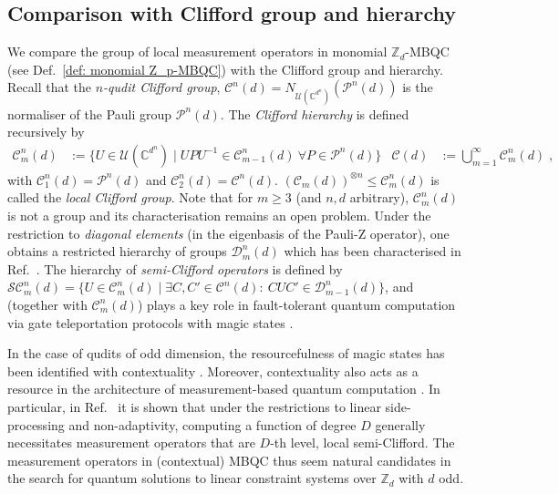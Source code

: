 \documentclass[aps,pra,letterpaper,onrcolumn,nofootinbib,notitlepage,longbibliography]{revtex4-1}
\newcommand{\zz}{\mathbb Z}
\newcommand{\C}{\mathbb C}
\newcommand\mc[1]{\mathcal{#1}}
\newcommand{\cC}{\mc{C}}
\newcommand{\cD}{\mc{D}}
\newcommand{\cP}{\mc{P}}
\newcommand{\cU}{\mc{U}}
\newcommand{\SC}{\mc{SC}}
\begin{document}
\subsection{Comparison with Clifford group and hierarchy}\label{sec: relation with Clifford group}

We compare the group of local measurement operators in monomial $\zz_d$-MBQC (see Def.~\ref{def: monomial Z_p-MBQC}) with the Clifford group and hierarchy. Recall that the \emph{$n$-qudit Clifford group}, $\cC^n(d)=N_{\cU(\C^{d^n})}(\cP^n(d))$ is the normaliser of the Pauli group $\cP^n(d)$. The \emph{Clifford hierarchy} is defined recursively by
\begin{align*}
    \cC^n_m(d)
    &:=\{U\in\cU(\C^{d^n})\mid UPU^{-1}\in\cC^n_{m-1}(d)\ \forall P\in\cP^n(d)\} &
    \cC(d)
    &:=\bigcup_{m=1}^\infty\cC^n_m(d)\; ,
\end{align*}
with $\cC^n_1(d)=\cP^n(d)$ and $\cC^n_2(d)=\cC^n(d)$. $(\cC_m(d))^{\otimes n}\leq\cC^n_m(d)$ is called the \emph{local Clifford group}. Note that for $m\geq 3$ (and $n,d$ arbitrary), $\cC^n_m(d)$ is not a group and its characterisation remains an open problem. Under the restriction to \emph{diagonal elements} (in the eigenbasis of the Pauli-Z operator), one obtains a restricted hierarchy of groups $\cD^n_m(d)$ which has been characterised in Ref.~\cite{CuiGottesmanKrishna2017}. The hierarchy of \emph{semi-Clifford operators} \cite{ZengChenChuang2008} is defined by $\SC^n_m(d)=\{U\in\cC^n_m(d)\mid \exists C,C'\in\cC^n(d):\ CUC'\in\cD^n_{m-1}(d)\}$, and (together with $\cC^n_m(d)$) plays a key role in fault-tolerant quantum computation via gate teleportation protocols with magic states \cite{GottesmanChuang1999,ZhouLeungChuang2000,ZengChenChuang2008,BeigiShor2010,deSilva2021,ChenDeSilva2024}.

In the case of qudits of odd dimension, the resourcefulness of magic states has been identified with contextuality \cite{howard2012qudit}. Moreover, contextuality also acts as a resource in the architecture of measurement-based quantum computation \cite{RaussendorfBriegel2001,BriegelRaussendorf2001}. In particular, in Ref.~\cite{FrembsRobertsCampbellBartlett2022} it is shown that under the restrictions to linear side-processing and non-adaptivity, computing a function of degree $D$ generally necessitates measurement operators that are $D$-th level, local semi-Clifford. The measurement operators in (contextual) MBQC thus seem natural candidates in the search for quantum solutions to linear constraint systems over $\zz_d$ with $d$ odd.
\end{document}
